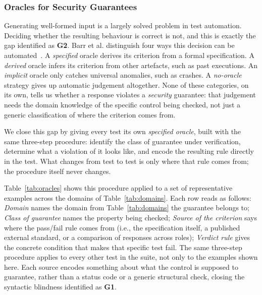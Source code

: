 \subsubsection{Oracles for Security Guarantees}
\label{sec:oracles}

Generating well-formed input is a largely solved problem in test automation. Deciding whether the resulting behaviour is correct is not, and this is exactly the gap identified as \textbf{G2}.
Barr et al. distinguish four ways this decision can be automated~\cite{barrOracleProblemSoftware2015}. A \emph{specified} oracle derives its criterion from a formal specification. A \emph{derived} oracle infers its criterion from other artefacts, such as past executions. An \emph{implicit} oracle only catches universal anomalies, such as crashes. A \emph{no-oracle} strategy gives up automatic judgement altogether.
None of these categories, on its own, tells us whether a response violates a \emph{security} guarantee: that judgement needs the domain knowledge of the specific control being checked, not just a generic classification of where the criterion comes from.

We close this gap by giving every test its own \emph{specified oracle}, built with the same three-step procedure: identify the class of guarantee under verification, determine what a violation of it looks like, and encode the resulting rule directly in the test.
What changes from test to test is only where that rule comes from; the procedure itself never changes.

Table~\ref{tab:oracles} shows this procedure applied to a set of representative examples across the domains of Table~\ref{tab:domains}.
Each row reads as follows: \emph{Domain} names the domain from Table~\ref{tab:domains} the guarantee belongs to; \emph{Class of guarantee} names the property being checked; \emph{Source of the criterion} says where the pass/fail rule comes from (i.e., the specification itself, a published external standard, or a comparison of responses across roles); \emph{Verdict rule} gives the concrete condition that makes that specific test fail.
The same three-step procedure applies to every other test in the suite, not only to the examples shown here.
Each source encodes something about what the control is supposed to guarantee, rather than a status code or a generic structural check, closing the syntactic blindness identified as \textbf{G1}.

